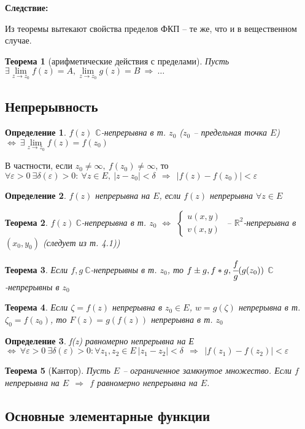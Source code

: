 \documentclass[draft]{report}
\newcommand{\then}{\ \Rightarrow\ }
\newcommand{\R}{\mathbb{R}}
\renewcommand{\C}{\mathbb{C}}
\newcommand{\mlim}[1]{\underset{#1}{\lim}}
\newcommand{\LRA}{\Leftrightarrow}
\newcommand{\epsdelta}{\forall \e>0\ \exists \delta(\e)>0\colon}
\newcommand{\e}{\varepsilon}
\newcommand{\sys}[1]{\left\{\begin{matrix}#1\end{matrix}\right.}
\newcommand{\opr}[1]{\begin{opred}#1\end{opred}}
\newtheorem*{theor}{Теорема}
\newtheorem*{opred}{Определение}
\theoremstyle{remark}
\begin{document}
{\bfseries Следствие:}

Из теоремы вытекают свойства пределов ФКП -- те же, что и в вещественном случае.

\begin{theor}[арифметические действия с пределами]
Пусть $\exists \mlim{z\to z_0}f(z)=A, \mlim{z\to z_0}g(z)=B \then \ldots$
\end{theor}

\subsection{Непрерывность}

\opr{$f(z)$ $\C$-непрерывна в т. $z_0$ ($z_0$ -- предельная точка $E$) $\LRA\ \exists \mlim{z\to z_0}f(z)=f(z_0)$}

В частности, если $z_0\neq\infty,\ f(z_0)\neq\infty$, то $\epsdelta\ \forall z\in E,\ |z-z_0|<\delta\ \then\ |f(z)-f(z_0)|<\e$

\opr{$f(z)$ непрерывна на $E$, если $f(z)$ непрерывна $\forall z\in E$}

\begin{theor}
$f(z)\ \C$-непрерывна в т. $z_0$ $\LRA$ $\sys{u(x,y)\\v(x,y)}$ -- $\R^2$-непрерывна в $(x_0,y_0)$ (следует из т. 4.1))
\end{theor}

\begin{theor}
Если $f,g\ \C$-непрерывны в т. $z_0$, то $f\pm g, f*g, \cfrac fg (g(z_0))$ $\C$-непрерывны в $z_0$
\end{theor}

\begin{theor}
Если $\zeta=f(z)$ непрерывна в $z_0\in E$, $w=g(\zeta)$ непрерывна в т. $\zeta_0=f(z_0)$, то $F(z)=g(f(z))$ непрерывна в т. $z_0$
\end{theor}

\opr{f(z) равномерно непрерывна на Е $\LRA\ \epsdelta \forall z_1,z_2\in E\ |z_1-z_2|<\delta\ \then\ |f(z_1)-f(z_2)|<\e$}

\begin{theor}[Кантор]
Пусть $E$ -- ограниченное замкнутое множество. Если $f$ непрерывна на $E\ \then\ f$ равномерно непрерывна на $E$.
\end{theor}

\subsection{Основные элементарные функции}
\end{document}
